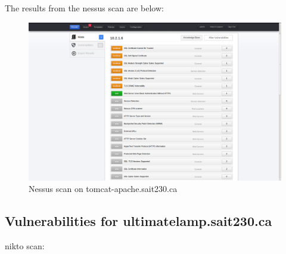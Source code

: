 \documentclass{article}
\begin{document}
The results from the nessus scan are below:

\begin{figure}[h!]
	\includegraphics[width=\linewidth]{images/nessus-tomcat.png}
	\caption{Nessus scan on tomcat-apache.sait230.ca}
	\label{fig:nessus-tomcat}
\end{figure}

\newpage
\subsection{Vulnerabilities for ultimatelamp.sait230.ca}
nikto scan:
\end{document}
